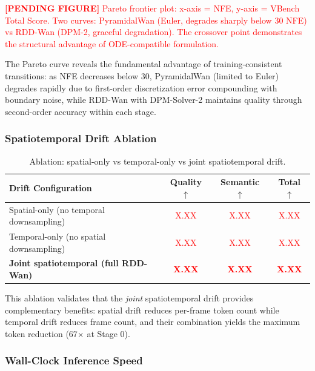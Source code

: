 \documentclass[10pt]{article}
\begin{document}
\textcolor{red}{\textbf{[PENDING FIGURE]} Pareto frontier plot: x-axis = NFE, y-axis = VBench Total Score. Two curves: PyramidalWan (Euler, degrades sharply below 30 NFE) vs RDD-Wan (DPM-2, graceful degradation). The crossover point demonstrates the structural advantage of ODE-compatible formulation.}

The Pareto curve reveals the fundamental advantage of training-consistent transitions: as NFE decreases below 30, PyramidalWan (limited to Euler) degrades rapidly due to first-order discretization error compounding with boundary noise, while RDD-Wan with DPM-Solver-2 maintains quality through second-order accuracy within each stage.

\subsubsection{Spatiotemporal Drift Ablation}

\begin{table}[t]
\centering
\caption{Ablation: spatial-only vs temporal-only vs joint spatiotemporal drift.}
\label{tab:st_ablation}
\small
\begin{tabular}{@{}lccc@{}}
\toprule
\textbf{Drift Configuration} & \textbf{Quality} $\uparrow$ & \textbf{Semantic} $\uparrow$ & \textbf{Total} $\uparrow$ \\
\midrule
Spatial-only (no temporal downsampling) & \textcolor{red}{X.XX} & \textcolor{red}{X.XX} & \textcolor{red}{X.XX} \\
Temporal-only (no spatial downsampling) & \textcolor{red}{X.XX} & \textcolor{red}{X.XX} & \textcolor{red}{X.XX} \\
\textbf{Joint spatiotemporal (full RDD-Wan)} & \textcolor{red}{\textbf{X.XX}} & \textcolor{red}{\textbf{X.XX}} & \textcolor{red}{\textbf{X.XX}} \\
\bottomrule
\end{tabular}
\end{table}

This ablation validates that the \emph{joint} spatiotemporal drift provides complementary benefits: spatial drift reduces per-frame token count while temporal drift reduces frame count, and their combination yields the maximum token reduction (67$\times$ at Stage 0).

\subsubsection{Wall-Clock Inference Speed}
\end{document}
